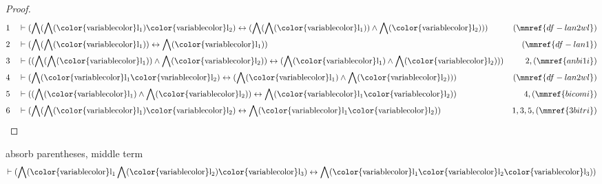 \begin{proof}
\begin{align}
  1 && & \vdash ( \bigwedge( \bigwedge( {\rm\color{variablecolor}l_1} )
      {\rm\color{variablecolor}l_2} ) \leftrightarrow (
      \bigwedge( \bigwedge( {\rm\color{variablecolor}l_1} )
      ) \wedge \bigwedge( {\rm\color{variablecolor}l_2} ) )
      )&(\mmref{df-lan2wl})\notag
  \\ 2 && & \vdash ( \bigwedge( \bigwedge( {\rm\color{variablecolor}l_1} ) )
      \leftrightarrow \bigwedge(
      {\rm\color{variablecolor}l_1} )
      )&(\mmref{df-lan1})\notag
  \\ 3 && & \vdash ( ( \bigwedge( \bigwedge( {\rm\color{variablecolor}l_1} ) )
      \wedge \bigwedge( {\rm\color{variablecolor}l_2} ) )
      \leftrightarrow ( \bigwedge(
      {\rm\color{variablecolor}l_1} ) \wedge \bigwedge(
      {\rm\color{variablecolor}l_2} ) )
      )&2,(\mmref{anbi1i})\notag
  \\ 4 && & \vdash ( \bigwedge( {\rm\color{variablecolor}l_1}
      {\rm\color{variablecolor}l_2} ) \leftrightarrow (
      \bigwedge( {\rm\color{variablecolor}l_1} ) \wedge
      \bigwedge( {\rm\color{variablecolor}l_2} ) )
      )&(\mmref{df-lan2wl})\notag
  \\ 5 && & \vdash ( ( \bigwedge( {\rm\color{variablecolor}l_1} ) \wedge
      \bigwedge( {\rm\color{variablecolor}l_2} ) )
      \leftrightarrow \bigwedge(
      {\rm\color{variablecolor}l_1}
      {\rm\color{variablecolor}l_2} )
      )&4,(\mmref{bicomi})\notag
  \\ 6 && & \vdash ( \bigwedge( \bigwedge( {\rm\color{variablecolor}l_1} )
      {\rm\color{variablecolor}l_2} ) \leftrightarrow
      \bigwedge( {\rm\color{variablecolor}l_1}
      {\rm\color{variablecolor}l_2} )
      )&1,3,5,(\mmref{3bitri})\notag
\end{align}
\end{proof}

\begin{lemma} absorb parentheses, middle term
\begin{align}
\vdash ( \bigwedge( {\rm\color{variablecolor}l_1} \bigwedge(
    {\rm\color{variablecolor}l_2} ) {\rm\color{variablecolor}l_3} )
    \leftrightarrow \bigwedge( {\rm\color{variablecolor}l_1}
    {\rm\color{variablecolor}l_2} {\rm\color{variablecolor}l_3} )
    )\label{bl.anabpm}
\end{align}
\end{lemma}

